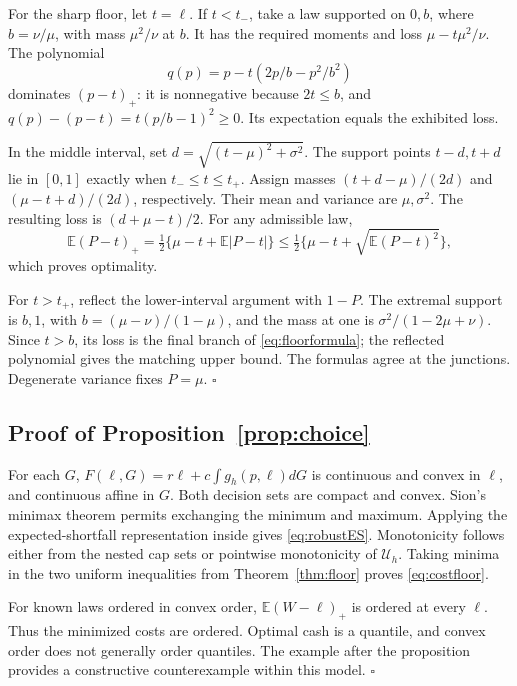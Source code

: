 \documentclass[11pt]{article}
\theoremstyle{definition}\newtheorem{definition}[theorem]{Definition}
\newcommand{\E}{\mathbb E}
\newcommand{\U}{\mathcal U}
\newcommand{\pos}[1]{\left(#1\right)_+}
\begin{document}
For the sharp floor, let \(t=\ell\). If \(t<t_-\), take a law supported on \(0,b\), where \(b=\nu/\mu\), with mass \(\mu^2/\nu\) at \(b\). It has the required moments and loss \(\mu-t\mu^2/\nu\). The polynomial
\[q(p)=p-t(2p/b-p^2/b^2)\]
dominates \(\pos{p-t}\): it is nonnegative because \(2t\leq b\), and \(q(p)-(p-t)=t(p/b-1)^2\geq0\). Its expectation equals the exhibited loss.

In the middle interval, set \(d=\sqrt{(t-\mu)^2+\sigma^2}\). The support points \(t-d,t+d\) lie in \([0,1]\) exactly when \(t_-\leq t\leq t_+\). Assign masses \((t+d-\mu)/(2d)\) and \((\mu-t+d)/(2d)\), respectively. Their mean and variance are \(\mu,\sigma^2\). The resulting loss is \((d+\mu-t)/2\). For any admissible law,
\[\E\pos{P-t}=\tfrac12\{\mu-t+\E|P-t|\}
 \leq\tfrac12\{\mu-t+\sqrt{\E(P-t)^2}\},\]
which proves optimality.

For \(t>t_+\), reflect the lower-interval argument with \(1-P\). The extremal support is \(b,1\), with \(b=(\mu-\nu)/(1-\mu)\), and the mass at one is \(\sigma^2/(1-2\mu+\nu)\). Since \(t>b\), its loss is the final branch of \eqref{eq:floorformula}; the reflected polynomial gives the matching upper bound. The formulas agree at the junctions. Degenerate variance fixes \(P=\mu\). \hfill\(\square\)

\subsection{Proof of Proposition~\ref{prop:choice}}
For each \(G\), \(F(\ell,G)=r\ell+c\int g_h(p,\ell)dG\) is continuous and convex in \(\ell\), and continuous affine in \(G\). Both decision sets are compact and convex. Sion's minimax theorem permits exchanging the minimum and maximum. Applying the expected-shortfall representation inside gives \eqref{eq:robustES}. Monotonicity follows either from the nested cap sets or pointwise monotonicity of \(\U_h\). Taking minima in the two uniform inequalities from Theorem~\ref{thm:floor} proves \eqref{eq:costfloor}.

For known laws ordered in convex order, \(\E\pos{W-\ell}\) is ordered at every \(\ell\). Thus the minimized costs are ordered. Optimal cash is a quantile, and convex order does not generally order quantiles. The example after the proposition provides a constructive counterexample within this model. \hfill\(\square\)
\end{document}
